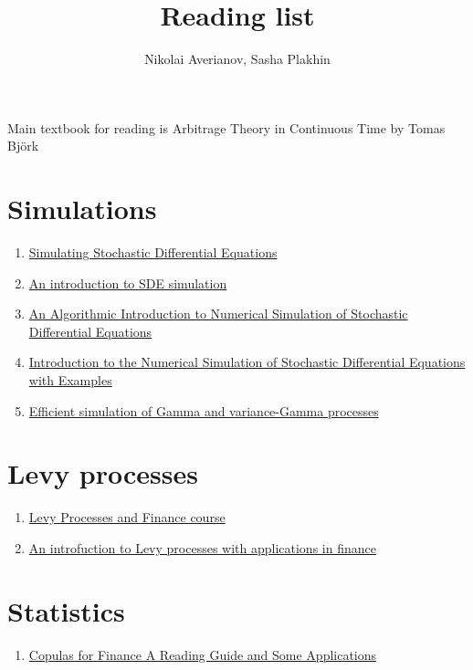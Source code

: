 \documentclass[a4paper, 12pt]{article}
\author{Nikolai Averianov, Sasha Plakhin}
\title{Reading list}
\begin{document}
\maketitle

Main textbook for reading is 
Arbitrage Theory in Continuous Time by Tomas Björk
\section*{Simulations}
\begin{enumerate}
	\item \href{http://www.columbia.edu/~mh2078/MonteCarlo/MCS_SDEs.pdf}{Simulating Stochastic Differential Equations}
	
	\item \href{https://arxiv.org/pdf/1004.0646.pdf}{An introduction to SDE simulation}
	
	\item \href{https://epubs.siam.org/doi/pdf/10.1137/S0036144500378302}{An Algorithmic Introduction to Numerical Simulation of Stochastic Differential Equations}
	
	\item \href{http://www.cs.fsu.edu/~mascagni/Petersen_SDE.pdf}{Introduction to the Numerical Simulation of Stochastic Differential Equations with Examples}
	
	\item \href{https://www.researchgate.net/publication/4053873_Efficient_simulation_of_Gamma_and_variance-Gamma_processes}{Efficient simulation of Gamma and variance-Gamma processes}
\end{enumerate}

\section*{Levy processes}
\begin{enumerate}
	\item \href{https://www.stats.ox.ac.uk/~winkel/ms3b10.pdf}{Levy Processes and Finance course}
	
	\item \href{https://arxiv.org/pdf/0804.0482.pdf}{An introfuction to Levy processes with applications in finance}
\end{enumerate}

\section*{Statistics}
\begin{enumerate}
	\item \href{http://www.thierry-roncalli.com/download/copula-survey.pdf}{Copulas for Finance A Reading Guide and Some Applications}
\end{enumerate}
\end{document}
